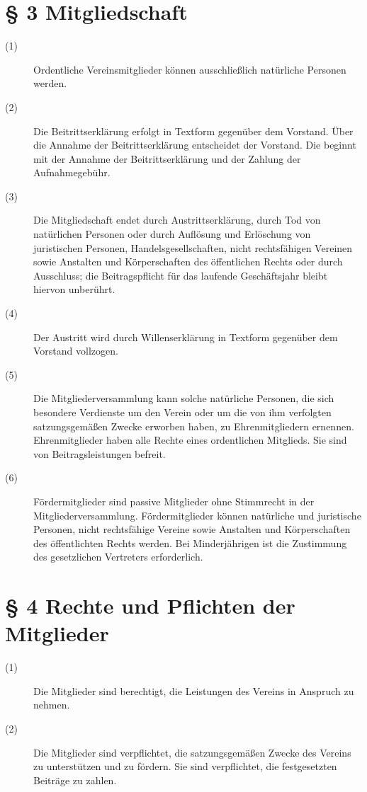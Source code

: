 \documentclass[12pt,paper=a4,ngerman]{scrreprt}
\begin{document}
\section{\S{} 3 Mitgliedschaft}
\begin{description}
	\item[(1)] Ordentliche Vereinsmitglieder können ausschließlich natürliche Personen werden.
	\item[(2)] Die Beitrittserklärung erfolgt in Textform gegenüber dem Vorstand. Über die Annahme der Beitrittserklärung entscheidet der Vorstand. Die beginnt mit der Annahme der Beitrittserklärung und der Zahlung der Aufnahmegebühr.
	\item[(3)] Die Mitgliedschaft endet durch Austrittserklärung, durch Tod von natürlichen Personen oder durch Auflösung und Erlöschung von juristischen Personen, Handelsgesellschaften, nicht rechtsfähigen Vereinen sowie Anstalten und Körperschaften des öffentlichen Rechts oder durch Ausschluss; die Beitragspflicht für das laufende Geschäftsjahr bleibt hiervon unberührt.
	\item[(4)] Der Austritt wird durch Willenserklärung in Textform gegenüber dem Vorstand vollzogen.
	\item[(5)] Die Mitgliederversammlung kann solche natürliche Personen, die sich besondere Verdienste um den Verein oder um die von ihm verfolgten satzungsgemäßen Zwecke erworben haben, zu Ehrenmitgliedern ernennen. Ehrenmitglieder haben alle Rechte eines ordentlichen Mitglieds. Sie sind von Beitragsleistungen befreit.
	\item[(6)] Fördermitglieder sind passive Mitglieder ohne Stimmrecht in der Mitgliederversammlung. Fördermitglieder können natürliche und juristische Personen, nicht rechtsfähige Vereine sowie Anstalten und Körperschaften des öffentlichten Rechts werden. Bei Minderjährigen ist die Zustimmung des gesetzlichen Vertreters erforderlich.
\end{description}
\section{\S{} 4 Rechte und Pflichten der Mitglieder}
\begin{description}
	\item[(1)] Die Mitglieder sind berechtigt, die Leistungen des Vereins in Anspruch zu nehmen.
	\item[(2)] Die Mitglieder sind verpflichtet, die satzungsgemäßen Zwecke des Vereins zu unterstützen und zu fördern. Sie sind verpflichtet, die festgesetzten Beiträge zu zahlen.
\end{description}
\end{document}
